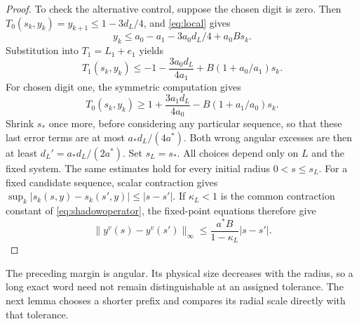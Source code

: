 \documentclass[11pt]{amsart}
\theoremstyle{definition}
\theoremstyle{remark}
\numberwithin{equation}{section}
\begin{document}
\begin{proof}
To check the alternative control, suppose the chosen digit is zero.
Then \(T_0(s_k,y_k)=y_{k+1}\le1-3d_L/4\), and \eqref{eq:local} gives
\[
 y_k\le a_0-a_1-3a_0d_L/4+a_0Bs_k.
\]
Substitution into \(T_1=L_1+e_1\) yields
\[
 T_1(s_k,y_k)\le-1-\frac{3a_0d_L}{4a_1}
                           +B(1+a_0/a_1)s_k.
\]
For chosen digit one, the symmetric computation gives
\[
 T_0(s_k,y_k)\ge1+\frac{3a_1d_L}{4a_0}
                           -B(1+a_1/a_0)s_k.
\]
Shrink \(s_*\) once more, before considering any particular sequence,
so that these last error terms are at most
\(a_*d_L/(4a^*)\). Both wrong angular excesses are then at least
\(d_L'=a_*d_L/(2a^*)\). Set \(s_L=s_*\).
All choices depend only on \(L\) and the fixed system.
The same estimates hold for every initial radius $0<s\le s_L$.
For a fixed candidate sequence, scalar contraction gives
$\sup_k|s_k(s,y)-s_k(s',y)|\le|s-s'|$.
If $\kappa_L<1$ is the common contraction constant of
\eqref{eq:shadowoperator}, the fixed-point equations therefore give
\begin{equation}\label{eq:shadowcontinuous}
\|y^v(s)-y^v(s')\|_\infty
 \le\frac{a^*B}{1-\kappa_L}|s-s'|.
\end{equation}
\end{proof}

The preceding margin is angular. Its physical size decreases with
the radius, so a long exact word need not remain distinguishable at
an assigned tolerance. The next lemma chooses a shorter prefix and
compares its radial scale directly with that tolerance.
\end{document}
